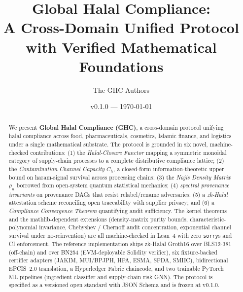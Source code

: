 \documentclass[11pt,a4paper]{article}
\title{Global Halal Compliance:\\
A Cross-Domain Unified Protocol with Verified Mathematical Foundations}
\author{The GHC Authors}
\date{v0.1.0 --- \today}
\theoremstyle{definition}
\theoremstyle{remark}
\newcommand{\Ch}{C_{h}}
\newcommand{\rhoN}{\rho_{n}}
\begin{document}
\maketitle

\begin{abstract}
We present \textbf{Global Halal Compliance (GHC)}, a cross-domain
protocol unifying halal compliance across food, pharmaceuticals,
cosmetics, Islamic finance, and logistics under a single mathematical
substrate. The protocol is grounded in six novel, machine-checked
contributions: (1) the \emph{Halal-Closure Functor} mapping a symmetric
monoidal category of supply-chain processes to a complete distributive
compliance lattice; (2) the \emph{Contamination Channel Capacity}
$\Ch$, a closed-form information-theoretic upper bound on
haram-signal survival across processing chains; (3) the \emph{Najis
Density Matrix} $\rhoN$ borrowed from open-system quantum
statistical mechanics; (4) \emph{spectral provenance invariants} on
provenance DAGs that resist relabel/rename adversaries; (5) a
\emph{zk-Halal} attestation scheme reconciling open traceability with
supplier privacy; and (6) a \emph{Compliance Convergence Theorem}
quantifying audit sufficiency. The kernel theorems and the
mathlib-dependent extensions (density-matrix purity bounds,
characteristic-polynomial invariance, Chebyshev / Chernoff audit
concentration, exponential channel survival under no-reinvention)
are all machine-checked in Lean~4 \cite{lean4} with zero
\texttt{sorry}s and CI enforcement. The reference implementation
ships zk-Halal Groth16 over BLS12-381 (off-chain) and over BN254
(EVM-deployable Solidity verifier), six fixture-backed certifier
adapters (JAKIM, MUI/BPJPH, HFA, ESMA, SFDA, SMIIC), bidirectional
EPCIS~2.0 \cite{epcis2} translation, a Hyperledger Fabric chaincode,
and two trainable PyTorch ML pipelines (ingredient classifier and
supply-chain risk GNN). The protocol is specified as a versioned
open standard with JSON Schema and is frozen at v0.1.0.
\end{abstract}

\tableofcontents













\printbibliography

\appendix


\end{document}
